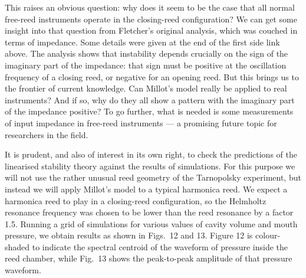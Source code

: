   This raises an obvious question: why does it seem to be the case that all 
  normal free-reed instruments operate in the closing-reed configuration? We 
  can get some insight into that question from Fletcher’s original analysis, 
  which was couched in terms of impedance. Some details were given at the end 
  of the first side link above. The analysis shows that instability depends 
  crucially on the sign of the imaginary part of the impedance: that sign must 
  be positive at the oscillation frequency of a closing reed, or negative for 
  an opening reed. But this brings us to the frontier of current knowledge. Can 
  Millot's model really be applied to real instruments? And if so, why do they 
  all show a pattern with the imaginary part of the impedance positive? To go 
  further, what is needed is some measurements of input impedance in free-reed 
  instruments — a promising future topic for researchers in the field. 

  It is prudent, and also of interest in its own right, to check the 
  predictions of the linearised stability theory against the results of 
  simulations. For this purpose we will not use the rather unusual reed 
  geometry of the Tarnopolsky experiment, but instead we will apply Millot’s 
  model to a typical harmonica reed. We expect a harmonica reed to play in a 
  closing-reed configuration, so the Helmholtz resonance frequency was chosen 
  to be lower than the reed resonance by a factor 1.5. Running a grid of 
  simulations for various values of cavity volume and mouth pressure, we obtain 
  results as shown in Figs.\ 12 and 13. Figure 12 is colour-shaded to indicate 
  the spectral centroid of the waveform of pressure inside the reed chamber, 
  while Fig.\ 13 shows the peak-to-peak amplitude of that pressure waveform. 



